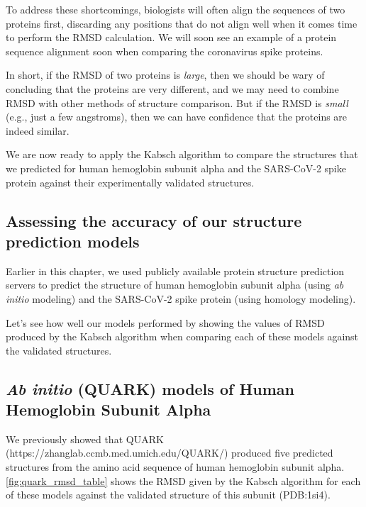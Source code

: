 To address these shortcomings, biologists will often align the sequences of two proteins first, discarding any positions that do not align well when it comes time to perform the RMSD calculation. We will soon see an example of a protein sequence alignment soon when comparing the coronavirus spike proteins.

In short, if the RMSD of two proteins is \textit{large}, then we should be wary of concluding that the proteins are very different, and we may need to combine RMSD with other methods of structure comparison. But if the RMSD is \textit{small} (e.g., just a few angstroms), then we can have confidence that the proteins are indeed similar.

We are now ready to apply the Kabsch algorithm to compare the structures that we predicted for human hemoglobin subunit alpha and the SARS-CoV-2 spike protein against their experimentally validated structures. 

\FloatBarrier
{}
\subsection{Assessing the accuracy of our structure prediction models}

Earlier in this chapter, we used publicly available protein structure prediction servers to predict the structure of human hemoglobin subunit alpha (using \textit{ab initio} modeling) and the SARS-CoV-2 spike protein (using homology modeling).

Let's see how well our models performed by showing the values of RMSD produced by the Kabsch algorithm when comparing each of these models against the validated structures.

\FloatBarrier
{}
\subsection{\textit{Ab initio} (QUARK) models of Human Hemoglobin Subunit Alpha}

We previously showed that QUARK (https://zhanglab.ccmb.med.umich.edu/QUARK/) produced five predicted structures from the amino acid sequence of human hemoglobin subunit alpha. \autoref{fig:quark_rmsd_table} shows the RMSD given by the Kabsch algorithm for each of these models against the validated structure of this subunit (PDB:1si4).

